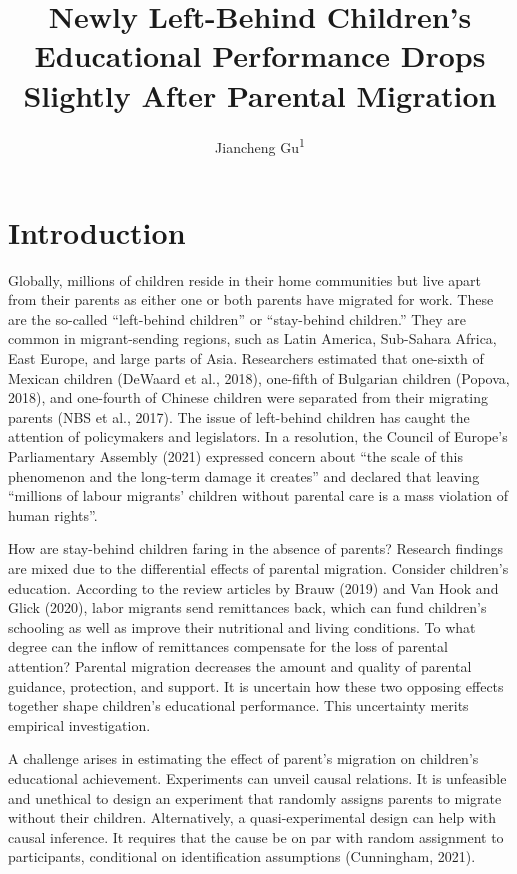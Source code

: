 \documentclass[
  man,floatsintext]{apa7}
\title{Newly Left-Behind Children's Educational Performance Drops Slightly After Parental Migration}
\author{Jiancheng Gu\textsuperscript{1}}
\date{}
\affiliation{\vspace{0.5cm}\textsuperscript{1} Faculty of Social Sciences, Vrije Universiteit Amsterdam}
\begin{document}
\maketitle

\hypertarget{introduction}{%
\section{Introduction}\label{introduction}}

Globally, millions of children reside in their home communities but live apart from their parents as either one or both parents have migrated for work. These are the so-called ``left-behind children'' or ``stay-behind children.'' They are common in migrant-sending regions, such as Latin America, Sub-Sahara Africa, East Europe, and large parts of Asia. Researchers estimated that one-sixth of Mexican children (DeWaard et al., 2018), one-fifth of Bulgarian children (Popova, 2018), and one-fourth of Chinese children were separated from their migrating parents (NBS et al., 2017). The issue of left-behind children has caught the attention of policymakers and legislators. In a resolution, the Council of Europe's Parliamentary Assembly (2021) expressed concern about ``the scale of this phenomenon and the long-term damage it creates'' and declared that leaving ``millions of labour migrants' children without parental care is a mass violation of human rights''.

How are stay-behind children faring in the absence of parents? Research findings are mixed due to the differential effects of parental migration. Consider children's education. According to the review articles by Brauw (2019) and Van Hook and Glick (2020), labor migrants send remittances back, which can fund children's schooling as well as improve their nutritional and living conditions. To what degree can the inflow of remittances compensate for the loss of parental attention? Parental migration decreases the amount and quality of parental guidance, protection, and support. It is uncertain how these two opposing effects together shape children's educational performance. This uncertainty merits empirical investigation.

A challenge arises in estimating the effect of parent's migration on children's educational achievement. Experiments can unveil causal relations. It is unfeasible and unethical to design an experiment that randomly assigns parents to migrate without their children. Alternatively, a quasi-experimental design can help with causal inference. It requires that the cause be on par with random assignment to participants, conditional on identification assumptions (Cunningham, 2021).
\end{document}
